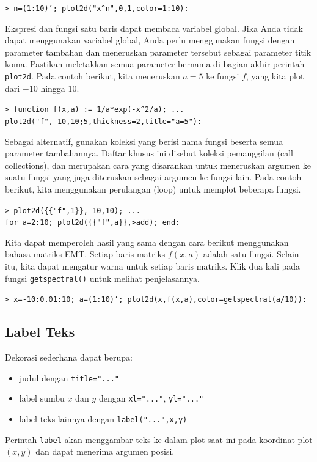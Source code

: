 \documentclass[11pt, a4paper]{article}
\newcommand{\emtcmd}[1]{\noindent\texttt{\textcolor{emtcommand}{>}\ #1}\par\smallskip}
\begin{document}
\emtcmd{n=(1:10)'; plot2d("x\^{}n",0,1,color=1:10):}

Ekspresi dan fungsi satu baris dapat membaca variabel global. Jika Anda tidak dapat menggunakan variabel global, Anda perlu menggunakan fungsi dengan parameter tambahan dan meneruskan parameter tersebut sebagai parameter titik koma. Pastikan meletakkan semua parameter bernama di bagian akhir perintah \texttt{plot2d}. Pada contoh berikut, kita meneruskan $a=5$ ke fungsi $f$, yang kita plot dari $-10$ hingga $10$.

\emtcmd{function f(x,a) := 1/a*exp(-x\^{}2/a); ... \\
\hspace*{1em} plot2d("f",-10,10;5,thickness=2,title="a=5"):}

Sebagai alternatif, gunakan koleksi yang berisi nama fungsi beserta semua parameter tambahannya. Daftar khusus ini disebut koleksi pemanggilan (call collections), dan merupakan cara yang disarankan untuk meneruskan argumen ke suatu fungsi yang juga diteruskan sebagai argumen ke fungsi lain. Pada contoh berikut, kita menggunakan perulangan (loop) untuk memplot beberapa fungsi.

\emtcmd{plot2d(\{\{"f",1\}\},-10,10); ... \\
\hspace*{1em} for a=2:10; plot2d(\{\{"f",a\}\},>add); end:}

Kita dapat memperoleh hasil yang sama dengan cara berikut menggunakan bahasa matriks EMT. Setiap baris matriks $f(x,a)$ adalah satu fungsi. Selain itu, kita dapat mengatur warna untuk setiap baris matriks. Klik dua kali pada fungsi \texttt{getspectral()} untuk melihat penjelasannya.

\emtcmd{x=-10:0.01:10; a=(1:10)'; plot2d(x,f(x,a),color=getspectral(a/10)):}

\subsection*{Label Teks}

Dekorasi sederhana dapat berupa:
\begin{itemize}
    \item judul dengan \texttt{title="..."}
    \item label sumbu $x$ dan $y$ dengan \texttt{xl="..."}, \texttt{yl="..."}
    \item label teks lainnya dengan \texttt{label("...",x,y)}
\end{itemize}

Perintah \texttt{label} akan menggambar teks ke dalam plot saat ini pada koordinat plot $(x,y)$ dan dapat menerima argumen posisi.
\end{document}
